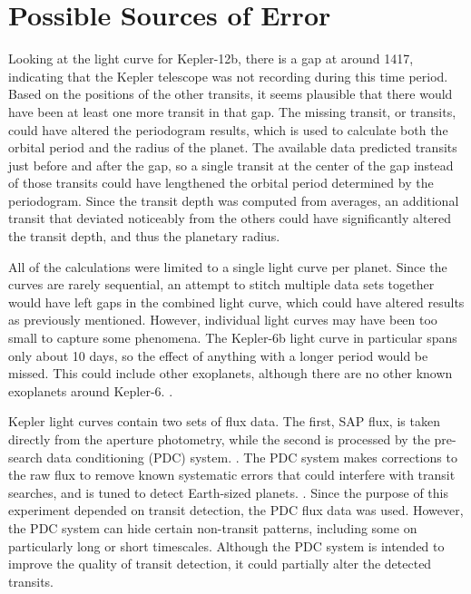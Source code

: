 \section{Possible Sources of Error}

Looking at the light curve for Kepler-12b, there is a gap at around \SI{1417}{\bjd}, indicating that the Kepler telescope was not recording during
this time period. Based on the positions of the other transits, it seems plausible that there would have been at least one more transit in that gap.
The missing transit, or transits, could have altered the periodogram results, which is used to calculate both the orbital period and the radius
of the planet. The available data predicted transits just before and after the gap, so a single transit at the center of the gap instead of those
transits could have lengthened the orbital period determined by the periodogram. Since the transit depth was computed from averages, an additional transit
that deviated noticeably from the others could have significantly altered the transit depth, and thus the planetary radius.

All of the calculations were limited to a single light curve per planet. Since the curves are rarely sequential, an attempt to stitch multiple data
sets together would have left gaps in the combined light curve, which could have altered results as previously mentioned. However, individual light
curves may have been too small to capture some phenomena. The Kepler-6b light curve in particular spans only about 10 days, so the effect of anything
with a longer period would be missed. This could include other exoplanets, although there are no other known exoplanets around Kepler-6. \autocite{exoplanetEncyclopedia}.

Kepler light curves contain two sets of flux data. The first, SAP flux, is taken directly from the aperture photometry, while the second is processed
by the pre-search data conditioning (PDC) system. \autocite{keplerManual}. The PDC system makes corrections to the raw flux to remove known
systematic errors that could interfere with transit searches, and is tuned to detect Earth-sized planets. \autocite{pdc}. Since the purpose of this experiment depended on transit detection, the
PDC flux data was used. However, the PDC system can hide certain non-transit patterns, including some on particularly long or short timescales. \autocite{pdc}
Although the PDC system is intended to improve the quality of transit detection, it could partially alter the detected transits.

